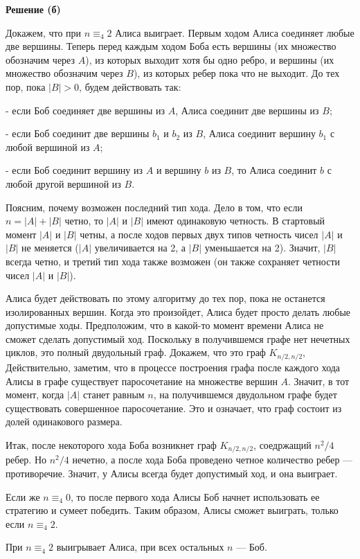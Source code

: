 \textbf{Решение (б)}

Докажем, что при $n\equiv_4 2$ Алиса выиграет.
Первым ходом Алиса соединяет любые две вершины. Теперь перед каждым
ходом Боба есть вершины (их множество обозначим через $A$), из которых
выходит хотя бы одно ребро, и вершины (их множество обозначим через
$B$), из которых ребер пока что не выходит. До тех пор, пока $|B|>0$,
будем действовать так:

-   если Боб соединяет две вершины из $A$, Алиса соединит две вершины из
    $B$;

-   если Боб соединит две вершины $b_1$ и $b_2$ из $B$, Алиса соединит
    вершину $b_1$ с любой вершиной из $A$;

-   если Боб соединит вершину из $A$ и вершину $b$ из $B$, то Алиса
    соединит $b$ с любой другой вершиной из $B$.

Поясним, почему возможен последний тип хода. Дело в том, что если
$n=|A|+|B|$ четно, то $|A|$ и $|B|$ имеют одинаковую четность. В
стартовый момент $|A|$ и $|B|$ четны, а после ходов первых двух типов
четность чисел $|A|$ и $|B|$ не меняется ($|A|$ увеличивается на 2, а
$|B|$ уменьшается на 2). Значит, $|B|$ всегда четно, и третий тип хода
также возможен (он также сохраняет четности чисел $|A|$ и $|B|$).

Алиса будет действовать по этому алгоритму до тех пор, пока не останется
изолированных вершин. Когда это произойдет, Алиса будет просто делать
любые допустимые ходы. Предположим, что в какой-то момент времени Алиса
не сможет сделать допустимый ход. Поскольку в получившемся графе нет
нечетных циклов, это полный двудольный граф. Докажем, что это граф
$K_{n/2, n/2}$, Действительно, заметим, что в процессе построения графа
после каждого хода Алисы в графе существует паросочетание на множестве
вершин $A$. Значит, в тот момент, когда $|A|$ станет равным $n$, на
получившемся двудольном графе будет существовать совершенное
паросочетание. Это и означает, что граф состоит из долей одинакового
размера.

Итак, после некоторого хода Боба возникнет граф $K_{n/2,n/2}$,
соедржащий $n^2/4$ ребер. Но $n^2/4$ нечетно, а после хода Боба
проведено четное количество ребер — противоречие. Значит, у Алисы всегда
будет допустимый ход, и она выиграет.

Если же $n\equiv_4 0$, то после первого хода Алисы Боб начнет
использовать ее стратегию и сумеет победить. Таким образом, Алисы сможет
выиграть, только если $n\equiv_4 2$.

При $n\equiv_4 2$ выигрывает Алиса, при всех остальных $n$ — Боб.

